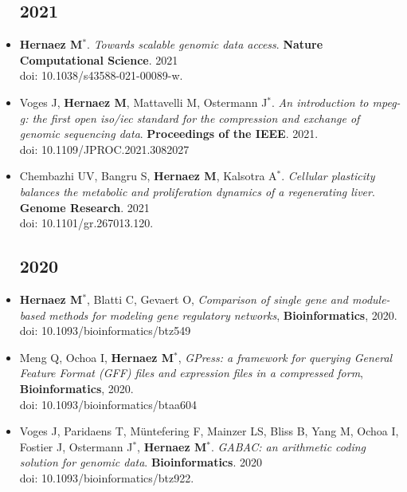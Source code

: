 \documentclass[11pt,a4paper,sans]{moderncv}        %
\begin{document}
\begin{itemize}
\subsection{2021}
\vspace{6pt}

\item \textbf{Hernaez M}$^{\ast}$. \textsl{Towards scalable genomic data access}. \textbf{Nature Computational Science}. 2021\\
doi: 10.1038/s43588-021-00089-w.\\

\item Voges J, \textbf{Hernaez M}, Mattavelli M, Ostermann J$^{\ast}$. \textsl{An introduction to mpeg-g: the first open iso/iec standard for the compression and exchange of genomic sequencing data}. \textbf{Proceedings of the IEEE}. 2021.\\
doi: 10.1109/JPROC.2021.3082027\\

\item Chembazhi UV, Bangru S, \textbf{Hernaez M}, Kalsotra A$^{\ast}$. \textsl{Cellular plasticity balances the metabolic and proliferation dynamics of a regenerating liver}. \textbf{Genome Research}. 2021\\
doi: 10.1101/gr.267013.120.\\

\subsection{2020}
\vspace{6pt}

\item \textbf{Hernaez M}$^\ast$, Blatti C, Gevaert O, \textsl{Comparison of single gene and module-based methods for modeling gene regulatory networks}, \textbf{Bioinformatics}, 2020.\\
doi: 10.1093/bioinformatics/btz549\\

\item Meng Q, Ochoa I, \textbf{Hernaez M}$^\ast$, \textsl{GPress: a framework for querying General Feature Format (GFF) files and expression files in a compressed form}, \textbf{Bioinformatics}, 2020.\\
doi: 10.1093/bioinformatics/btaa604\\

\item Voges J, Paridaens T, Müntefering F, Mainzer LS, Bliss B, Yang M, Ochoa I, Fostier J, Ostermann J$^\ast$, \textbf{Hernaez M}$^\ast$. \textsl{GABAC: an arithmetic coding solution for genomic data}. \textbf{Bioinformatics}. 2020\\ 
doi: 10.1093/bioinformatics/btz922.\\


\end{itemize}
\end{document}
